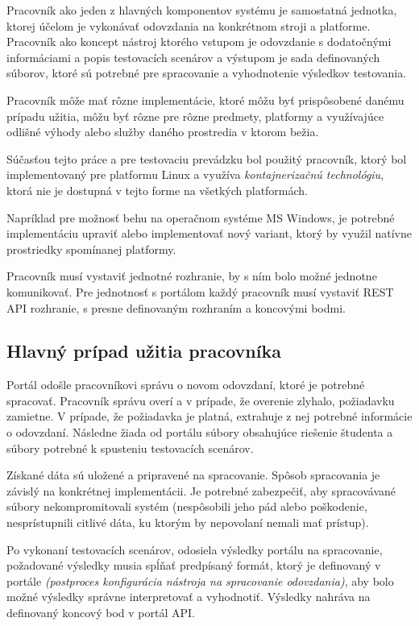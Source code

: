 \documentclass[
  digital, %
  twoside, %
  table,   %
  lof,     %
  lot,     %
]{fithesis3}
\begin{document}
Pracovník ako jeden z hlavných komponentov systému je samostatná jednotka, ktorej účelom je vykonávať odovzdania na konkrétnom stroji a platforme. Pracovník ako koncept nástroj ktorého vstupom je odovzdanie s dodatočnými informáciami a popis testovacích scenárov a výstupom je sada definovaných súborov, ktoré sú potrebné pre spracovanie a vyhodnotenie výsledkov testovania. 

Pracovník môže mať rôzne implementácie, ktoré môžu byť prispôsobené danému prípadu užitia, môžu byť rôzne pre rôzne predmety, platformy a využívajúce odlišné výhody alebo služby daného prostredia v ktorom bežia.

Súčasťou tejto práce a pre testovaciu prevádzku bol použitý pracovník, ktorý bol implementovaný pre platformu Linux a využíva \emph{kontajnerizačnú technológiu}, ktorá nie je dostupná v tejto forme na všetkých platformách.

Napríklad pre možnosť behu na operačnom systéme MS Windows, je potrebné implementáciu upraviť alebo implementovať nový variant, ktorý by využil natívne prostriedky spomínanej platformy.

Pracovník musí vystaviť jednotné rozhranie, by s ním bolo možné jednotne komunikovať. Pre jednotnosť s portálom každý pracovník musí vystaviť REST API rozhranie, s presne definovaným rozhraním a koncovými bodmi.

\subsection{Hlavný prípad užitia pracovníka}

Portál odošle pracovníkovi správu o novom odovzdaní, ktoré je potrebné spracovať.
Pracovník správu overí a v prípade, že overenie zlyhalo, požiadavku zamietne.
V prípade, že požiadavka je platná, extrahuje z nej potrebné informácie o odovzdaní. Následne žiada od portálu súbory obsahujúce riešenie študenta a súbory potrebné k spusteniu testovacích scenárov. 

Získané dáta sú uložené a pripravené na spracovanie. Spôsob spracovania je závislý na konkrétnej implementácii. Je potrebné zabezpečiť, aby spracovávané súbory nekompromitovali systém (nespôsobili jeho pád alebo poškodenie, nesprístupnili citlivé dáta, ku ktorým by nepovolaní nemali mať prístup). 

Po vykonaní testovacích scenárov, odosiela výsledky portálu na spracovanie, požadované výsledky musia spĺňať predpísaný formát, ktorý je definovaný v portále \emph{(postproces konfigurácia nástroja na spracovanie odovzdania)}, aby bolo možné výsledky správne interpretovať a vyhodnotiť. Výsledky nahráva na definovaný koncový bod v portál API.
\end{document}
